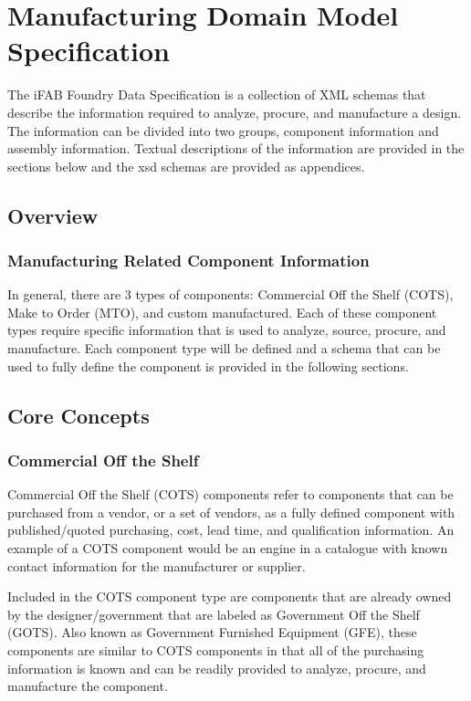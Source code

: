 \section{Manufacturing Domain Model Specification}
The iFAB Foundry Data Specification is a collection of XML schemas that describe the information required to analyze, procure, and manufacture a design.  The information can be divided into two groups, component information and assembly information.  Textual descriptions of the information are provided in the sections below and the xsd schemas are provided as appendices.
\subsection{Overview}
\subsubsection{Manufacturing Related Component Information}
In general, there are 3 types of components: Commercial Off the Shelf (COTS), Make to Order (MTO), and custom manufactured.  Each of these component types require specific information that is used to analyze, source, procure, and manufacture.   Each component type will be defined and a schema that can be used to fully define the component is provided in the following sections.

\subsection{Core Concepts}
\subsubsection{Commercial Off the Shelf}
Commercial Off the Shelf (COTS) components refer to components that can be purchased from a vendor, or a set of vendors, as a fully defined component with published/quoted purchasing, cost, lead time, and qualification information.  An example of a COTS component would be an engine in a catalogue with known contact information for the manufacturer or supplier.

Included in the COTS component type are components that are already owned by the designer/government that are labeled as Government Off the Shelf (GOTS).  Also known as Government Furnished Equipment (GFE), these components are similar to COTS components in that all of the purchasing information is known and can be readily provided to analyze, procure, and manufacture the component.

